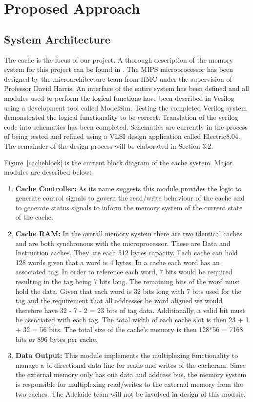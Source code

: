 \section{Proposed Approach}

\subsection{System Architecture}

The cache is the focus of our project. A thorough description of
the memory system for this project can be found in
\cite{various07}. The MIPS microprocessor has been designed by the
microarchitecture team from HMC under the supervision of Professor David
Harris. An interface of the entire system has been defined and all modules used to perform
the logical functions have been described in Verilog using a development tool
called ModelSim. Testing the completed Verilog system demonstrated the logical
functionality to be correct. Translation of the verilog code into schematics
has been completed. Schematics are currently in the process of being
tested and refined using a VLSI design application called Electric8.04. The
remainder of the design process will be elaborated in Section 3.2.

Figure~\ref{cacheblock} is the current block diagram of
the cache system. Major modules are described below:
\begin{enumerate}
\item \textbf{Cache Controller: }As its name suggests this module provides the logic to generate control signals to govern the read/write behaviour of the cache and to generate status signals to inform the memory system of the current state of the cache.
\item \textbf{Cache RAM: }In the overall memory system there are two identical caches and are both synchronous with the microprocessor. These are Data and Instruction caches. They are each 512 bytes capacity. Each cache can hold 128 words given that a word is 4 bytes. In a cache each word has an associated tag. In order to reference each word, 7 bits would be required resulting in the tag being 7 bits long. The remaining bits of the word must hold the data. Given that each word is 32 bits long with 7 bits used for the tag and the requirement that all addresses be word aligned we would therefore have  32 - 7 - 2 = 23 bits of tag data. Additionally, a valid bit must be associated with each tag. The total width of each cache slot is then 23 + 1 + 32 = 56 bits. The total size of the cache's memory is then 128*56 = 7168 bits or 896 bytes per cache.
\item \textbf{Data Output: }This module implements the multiplexing functionality to manage a bi-directional data line for reads and writes of the cacheram. Since the external memory only has one data and address bus, the memory system is responsible for multiplexing read/writes to the external memory from the two caches. The Adelaide team will not be involved in design of this module.
\end{enumerate}

